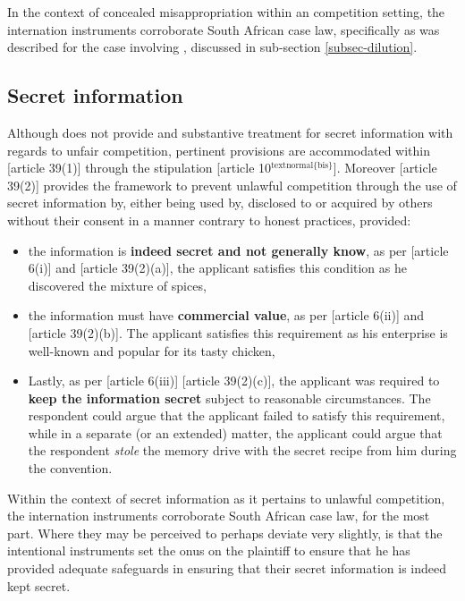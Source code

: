 \documentclass[11pt]{article}
\begin{document}
In the context of concealed misappropriation within an competition setting, the
internation instruments corroborate South African case law, specifically as was
described for the case involving \cite{joffe94_fifa_bartlett}, discussed in
sub-section \ref{subsec-dilution}.

\subsection{Secret information}
\label{sec:org9e5f16a}

Although \cite{wipo83_paris_conve_protect_ip} does not provide and substantive
treatment for secret information with regards to unfair competition, pertinent
provisions are accommodated within [article 39(1)]\cite{wto17_trips} through the
stipulation [article
10\(^{\text{textnormal\{bis\}}}\)]\cite{wipo83_paris_conve_protect_ip}. Moreover [article
39(2)]\cite{wto17_trips} provides the framework to prevent unlawful competition
through the use of secret information by, either being used by, disclosed to or
acquired by others without their consent in a manner contrary to honest
practices, provided:
\begin{itemize}
\item the information is \textbf{indeed secret and not generally know}, as per [article
6(i)]\cite{wipo96_model_provi_unfair_comp} and [article
39(2)(a)]\cite{wto17_trips}, the applicant satisfies this condition as he discovered the mixture of spices,
\item the information must have \textbf{commercial value}, as per [article
6(ii)]\cite{wipo96_model_provi_unfair_comp} and [article
39(2)(b)]\cite{wto17_trips}. The applicant satisfies this requirement as his enterprise is well-known and popular for its tasty chicken,
\item Lastly, as per [article 6(iii)]\cite{wipo96_model_provi_unfair_comp} [article
39(2)(c)]\cite{wto17_trips}, the applicant was required to \textbf{keep the information
secret} subject to reasonable circumstances. The respondent could argue that
the applicant failed to satisfy this requirement, while in a separate (or an
extended) matter, the applicant could argue that the respondent \emph{stole} the
memory drive with the secret recipe from him during the convention.
\end{itemize}

Within the context of secret information as it pertains to unlawful competition,
the internation instruments corroborate South African case law, for the most
part. Where they may be perceived to perhaps deviate very slightly, is that the
intentional instruments set the onus on the plaintiff to ensure that he has
provided adequate safeguards in ensuring that their secret information is indeed
kept secret.
\printbibliography
\end{document}

